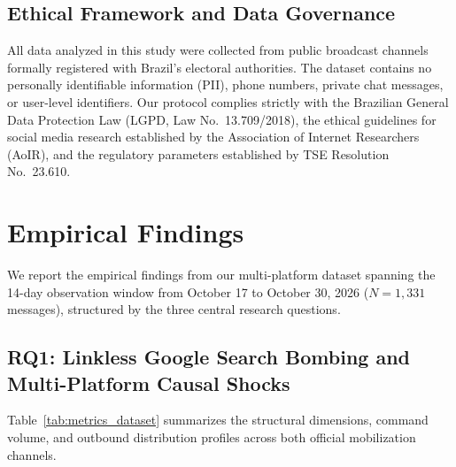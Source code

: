 \documentclass[preprint,12pt]{elsarticle}
\begin{document}
\subsection{Ethical Framework and Data Governance}
All data analyzed in this study were collected from public broadcast channels formally registered with Brazil's electoral authorities. The dataset contains no personally identifiable information (PII), phone numbers, private chat messages, or user-level identifiers. Our protocol complies strictly with the Brazilian General Data Protection Law (LGPD, Law No.\ 13.709/2018), the ethical guidelines for social media research established by the Association of Internet Researchers (AoIR), and the regulatory parameters established by TSE Resolution No.\ 23.610.

\section{Empirical Findings}\label{sec:findings}

We report the empirical findings from our multi-platform dataset spanning the 14-day observation window from October 17 to October 30, 2026 ($N=1,331$ messages), structured by the three central research questions.

\subsection{RQ1: Linkless Google Search Bombing and Multi-Platform Causal Shocks}

Table~\ref{tab:metrics_dataset} summarizes the structural dimensions, command volume, and outbound distribution profiles across both official mobilization channels.
\end{document}
